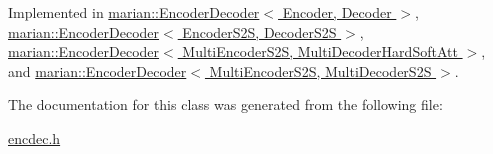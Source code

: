 Implemented in \hyperlink{classmarian_1_1EncoderDecoder_a558f6af38685965b966512478de18c4b}{marian\+::\+Encoder\+Decoder$<$ Encoder, Decoder $>$}, \hyperlink{classmarian_1_1EncoderDecoder_a558f6af38685965b966512478de18c4b}{marian\+::\+Encoder\+Decoder$<$ Encoder\+S2\+S, Decoder\+S2\+S $>$}, \hyperlink{classmarian_1_1EncoderDecoder_a558f6af38685965b966512478de18c4b}{marian\+::\+Encoder\+Decoder$<$ Multi\+Encoder\+S2\+S, Multi\+Decoder\+Hard\+Soft\+Att $>$}, and \hyperlink{classmarian_1_1EncoderDecoder_a558f6af38685965b966512478de18c4b}{marian\+::\+Encoder\+Decoder$<$ Multi\+Encoder\+S2\+S, Multi\+Decoder\+S2\+S $>$}.



The documentation for this class was generated from the following file\+:\begin{DoxyCompactItemize}
\item 
\hyperlink{encdec_8h}{encdec.\+h}\end{DoxyCompactItemize}
